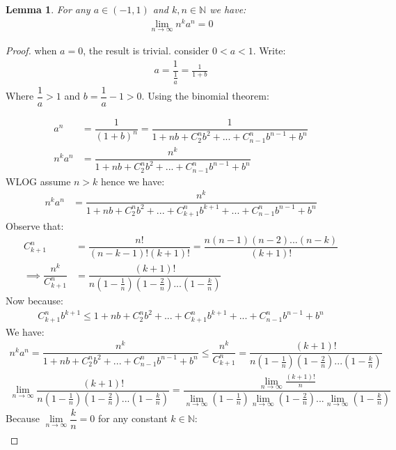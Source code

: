 \documentclass[12pt]{book}
\newtheorem{lemma}{Lemma}
\theoremstyle{definition}
\begin{document}
\begin{lemma}
For any $a \in (-1,1)$ and $k,n \in \mathbb{N}$ we have:
\begin{align*}
\lim\limits_{n \to \infty} n^ka^n =0
\end{align*}
\end{lemma}
\begin{proof}
	when $a=0$, the result is trivial. consider $0<a<1$. Write:
\begin{align*}
	a = \dfrac{1}{\frac{1}{a}} = \frac{1}{1+b}	
\end{align*}
 Where $\dfrac{1}{a} > 1$ and $b = \dfrac{1}{a} - 1 > 0$. Using the binomial theorem:
 
\begingroup
\addtolength{\jot}{1em}
\begin{align*}
a^n &= \dfrac{1}{(1+b)^n} = \dfrac{1}{1 + nb + C^n_2 b^2+...+C^n_{n-1}b^{n-1} +b^n} \\
n^ka^n &= \dfrac{n^k}{1 + nb + C^n_2 b^2+...+C^n_{n-1}b^{n-1} +b^n}	
\end{align*}
\endgroup
WLOG assume $n>k$ hence we have:
\begin{align*}
	n^ka^n &= \dfrac{n^k}{1 + nb + C^n_2 b^2+...+C^n_{k+1}b^{k+1}+...+C^n_{n-1}b^{n-1} +b^n}	
\end{align*}
Observe that:
\begin{align*}
	C^n_{k+1} &= \dfrac{n!}{(n-k -1)!(k+1)!} = \dfrac{n(n-1)(n-2)...(n-k)}{(k+1)!}\\ 
	\implies \dfrac{n^k}{C^n_{k+1}} &= \dfrac{(k+1)!}{n(1-\frac{1}{n})(1-\frac{2}{n})...(1-\frac{k}{n})}
\end{align*}
 Now because:
 \begin{align*}
 C^n_{k+1}b^{k+1} \leq 	1 + nb + C^n_2 b^2+...+C^n_{k+1}b^{k+1}+...+C^n_{n-1}b^{n-1} +b^n 
 \end{align*}
We have:
\begingroup
\addtolength{\jot}{1em}
\begin{align*}
	n^ka^n = \dfrac{n^k}{1 + nb + C^n_2 b^2+...+C^n_{n-1}b^{n-1} +b^n}	\leq \dfrac{n^k}{C^n_{k+1}} = \dfrac{(k+1)!}{n(1-\frac{1}{n})(1-\frac{2}{n})...(1-\frac{k}{n})}\\
	\lim\limits_{n \to \infty }\dfrac{(k+1)!}{n(1-\frac{1}{n})(1-\frac{2}{n})...(1-\frac{k}{n})} = \dfrac{\lim\limits_{n\to \infty}\frac{(k+1)!}{n}}{\lim\limits_{n\to \infty}(1-\frac{1}{n})\lim\limits_{n\to \infty}(1-\frac{2}{n})...\lim\limits_{n\to \infty}(1-\frac{k}{n})}
\end{align*}
\endgroup
Because $\lim\limits_{n\to \infty}\dfrac{k}{n} =0$ for any constant $k \in \mathbb{N}$:
\begin{align*}

\end{align*}
\end{proof}
\end{document}
